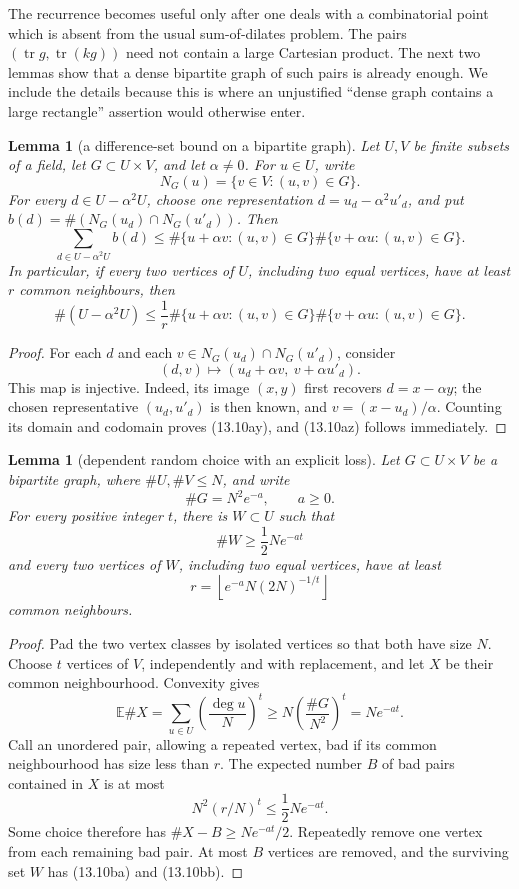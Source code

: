 \documentclass[11pt,reqno]{amsart}
\newtheorem{lemma}[theorem]{Lemma}
\theoremstyle{definition}
\theoremstyle{remark}
\newcommand{\Tr}{\operatorname{tr}}
\begin{document}
The recurrence becomes useful only after one deals with a combinatorial
point which is absent from the usual sum-of-dilates problem.  The pairs
\((\Tr g,\Tr(kg))\) need not contain a large Cartesian product.  The next
two lemmas show that a dense bipartite graph of such pairs is already
enough.  We include the details because this is where an unjustified
``dense graph contains a large rectangle'' assertion would otherwise enter.

\begin{lemma}[a difference-set bound on a bipartite graph]
\label{lem:graph-ruzsa}
Let \(U,V\) be finite subsets of a field, let
\(G\subset U\times V\), and let \(\alpha\ne0\).  For
\(u\in U\), write
\[
 N_G(u)=\{v\in V:(u,v)\in G\}.
\]
For every \(d\in U-\alpha^2U\), choose one representation
\(d=u_d-\alpha^2u'_d\), and put
\(b(d)=\#(N_G(u_d)\cap N_G(u'_d))\).  Then
\[
 \sum_{d\in U-\alpha^2U}b(d)
 \le
 \#\{u+\alpha v:(u,v)\in G\}
 \#\{v+\alpha u:(u,v)\in G\}.
\tag{13.10ay}
\]
In particular, if every two vertices of \(U\), including two equal
vertices, have at least \(r\) common neighbours, then
\[
 \#(U-\alpha^2U)
 \le \frac{1}{r}
 \#\{u+\alpha v:(u,v)\in G\}
 \#\{v+\alpha u:(u,v)\in G\}.
\tag{13.10az}
\]
\end{lemma}

\begin{proof}
For each \(d\) and each
\(v\in N_G(u_d)\cap N_G(u'_d)\), consider
\[
 (d,v)\longmapsto
 (u_d+\alpha v,\ v+\alpha u'_d).
\]
This map is injective.  Indeed, its image \((x,y)\) first recovers
\(d=x-\alpha y\); the chosen representative \((u_d,u'_d)\) is then
known, and \(v=(x-u_d)/\alpha\).  Counting its domain and codomain proves
(13.10ay), and (13.10az) follows immediately.
\end{proof}

\begin{lemma}[dependent random choice with an explicit loss]
\label{lem:drc-explicit}
Let \(G\subset U\times V\) be a bipartite graph, where
\(\#U,\#V\le N\), and write
\[
 \#G=N^2e^{-a},\qquad a\ge0.
\]
For every positive integer \(t\), there is \(W\subset U\) such that
\[
 \#W\ge\frac12Ne^{-at}
\tag{13.10ba}
\]
and every two vertices of \(W\), including two equal vertices, have at
least
\[
 r=\left\lfloor e^{-a}N(2N)^{-1/t}\right\rfloor
\tag{13.10bb}
\]
common neighbours.
\end{lemma}

\begin{proof}
Pad the two vertex classes by isolated vertices so that both have size
\(N\).  Choose \(t\) vertices of \(V\), independently and with
replacement, and let \(X\) be their common neighbourhood.  Convexity gives
\[
 \mathbb E\#X
 =\sum_{u\in U}\left(\frac{\deg u}{N}\right)^t
 \ge N\left(\frac{\#G}{N^2}\right)^t
 =Ne^{-at}.
\]
Call an unordered pair, allowing a repeated vertex, bad if its common
neighbourhood has size less than \(r\).  The expected number \(B\) of bad
pairs contained in \(X\) is at most
\[
 N^2(r/N)^t\le\frac12Ne^{-at}.
\]
Some choice therefore has \(\#X-B\ge Ne^{-at}/2\).  Repeatedly remove one
vertex from each remaining bad pair.  At most \(B\) vertices are removed,
and the surviving set \(W\) has (13.10ba) and (13.10bb).
\end{proof}
\end{document}
